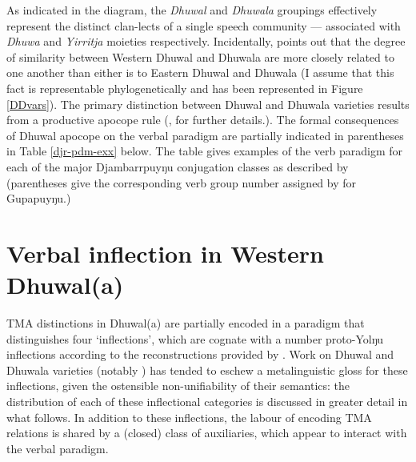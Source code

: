 As indicated in the diagram, the \textit{Dhuwal} and \textit{Dhuwala} groupings effectively represent the distinct clan-lects of a single speech community --- associated with \textit{Dhuwa} and \textit{Yirritja} moieties respectively. Incidentally, \citet{Wilkinson1991} points out that the degree of similarity between Western Dhuwal and Dhuwala are more closely related to one another than either is to Eastern Dhuwal and Dhuwala (I assume that this fact is representable phylogenetically and has been represented in Figure \ref{DDvars}). The primary distinction between Dhuwal and Dhuwala varieties results from a productive apocope rule (\citealp[51]{Morphy1977}, \citealp[see also][94\textit{ff}]{Wilkinson1991} for further details.). The formal consequences of Dhuwal apocope on the verbal paradigm are partially indicated in parentheses in Table \ref{djr-pdm-exx} below. The table gives examples of the verb paradigm for each of the major Djambarrpuyŋu conjugation classes as described by \citet[306ff]{Wilkinson1991} (parentheses give the corresponding verb group number assigned by \citet{Lowe1996} for Gupapuyŋu.)





\section{Verbal inflection in Western Dhuwal(a)}\label{infls}



TMA distinctions in Dhuwal(a) are partially encoded in a paradigm that distinguishes four `inflections', which are cognate with a number proto-Yolŋu inflections according to the reconstructions provided by \citet{Bowern2009}. Work on Dhuwal and Dhuwala varieties (notably \citealt{Wilkinson1991,Lowe1996}) has tended to eschew a metalinguistic gloss for these inflections, given the ostensible non-unifiability of their semantics: the distribution of each of these inflectional categories is discussed in greater detail in what follows. In addition to these inflections, the labour of encoding TMA relations is shared by a (closed) class of auxiliaries, which appear to interact with the verbal paradigm. 





